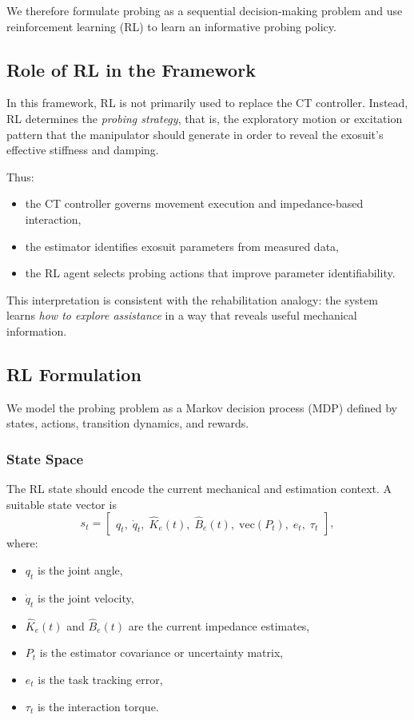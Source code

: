 \documentclass[11pt]{article}
\begin{document}
We therefore formulate probing as a sequential decision-making problem and use reinforcement learning (RL) to learn an informative probing policy.

\subsection{Role of RL in the Framework}

In this framework, RL is not primarily used to replace the CT controller. Instead, RL determines the \emph{probing strategy}, that is, the exploratory motion or excitation pattern that the manipulator should generate in order to reveal the exosuit's effective stiffness and damping.

Thus:
\begin{itemize}
    \item the CT controller governs movement execution and impedance-based interaction,
    \item the estimator identifies exosuit parameters from measured data,
    \item the RL agent selects probing actions that improve parameter identifiability.
\end{itemize}

This interpretation is consistent with the rehabilitation analogy: the system learns \emph{how to explore assistance} in a way that reveals useful mechanical information.

\subsection{RL Formulation}

We model the probing problem as a Markov decision process (MDP) defined by states, actions, transition dynamics, and rewards.

\subsubsection{State Space}

The RL state should encode the current mechanical and estimation context. A suitable state vector is
\begin{equation}
s_t =
\begin{bmatrix}
q_t,\;
\dot{q}_t,\;
\hat{K}_e(t),\;
\hat{B}_e(t),\;
\mathrm{vec}(P_t),\;
e_t,\;
\tau_t
\end{bmatrix},
\label{eq:rl_state}
\end{equation}
where:
\begin{itemize}
    \item \(q_t\) is the joint angle,
    \item \(\dot{q}_t\) is the joint velocity,
    \item \(\hat{K}_e(t)\) and \(\hat{B}_e(t)\) are the current impedance estimates,
    \item \(P_t\) is the estimator covariance or uncertainty matrix,
    \item \(e_t\) is the task tracking error,
    \item \(\tau_t\) is the interaction torque.
\end{itemize}
\end{document}
